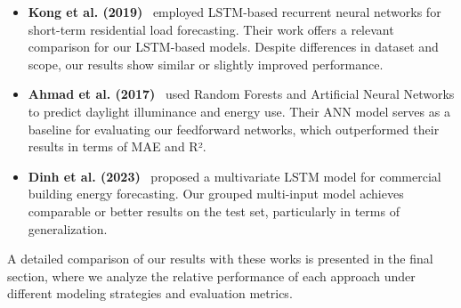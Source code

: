 \begin{itemize}
    \item \textbf{Kong et al. (2019)}~\cite{kong2019short} employed LSTM-based recurrent neural networks for short-term residential load forecasting. Their work offers a relevant comparison for our LSTM-based models. Despite differences in dataset and scope, our results show similar or slightly improved performance.
    
    \item \textbf{Ahmad et al. (2017)}~\cite{ahmad2017random} used Random Forests and Artificial Neural Networks to predict daylight illuminance and energy use. Their ANN model serves as a baseline for evaluating our feedforward networks, which outperformed their results in terms of MAE and R².
    
    \item \textbf{Dinh et al. (2023)}~\cite{khan2024image} proposed a multivariate LSTM model for commercial building energy forecasting. Our grouped multi-input model achieves comparable or better results on the test set, particularly in terms of generalization.
\end{itemize}

A detailed comparison of our results with these works is presented in the final section, where we analyze the relative performance of each approach under different modeling strategies and evaluation metrics.
